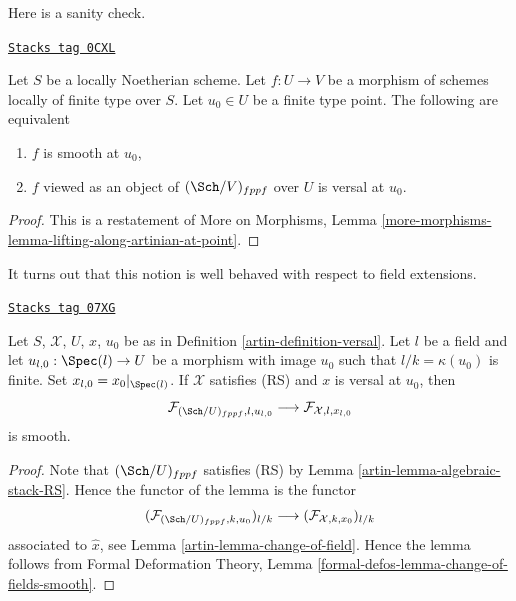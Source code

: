Here is a sanity check.

\begin{lemma}
\label{artin-lemma-versal-implies-smooth}
\href{https://stacks.math.columbia.edu/tag/0CXL}{\texttt{Stacks tag 0CXL}}

Let $S$ be a locally Noetherian scheme. Let $f : U \to V$
be a morphism of schemes locally of finite type over $S$.
Let $u_0 \in U$ be a finite type point. The following are equivalent
\begin{enumerate}
\item $f$ is smooth at $u_0$,
\item $f$ viewed as an object of $(\Sch/V)_{fppf}$ over $U$ is
versal at $u_0$.
\end{enumerate}
\end{lemma}

\begin{proof}
This is a restatement of More on Morphisms, Lemma
\ref{more-morphisms-lemma-lifting-along-artinian-at-point}.
\end{proof}

It turns out that this notion is well behaved with respect to field
extensions.

\begin{lemma}
\label{artin-lemma-versal-change-of-field}
\href{https://stacks.math.columbia.edu/tag/07XG}{\texttt{Stacks tag 07XG}}

Let $S$, $\mathcal{X}$, $U$, $x$, $u_0$ be as in
Definition \ref{artin-definition-versal}. Let $l$ be a field and let
$u_{l, 0} : \Spec(l) \to U$ be a morphism with image $u_0$ such that
$l/k = \kappa(u_0)$ is finite. Set $x_{l, 0} = x_0|_{\Spec(l)}$.
If $\mathcal{X}$ satisfies (RS) and $x$ is versal at $u_0$, then
$$
\mathcal{F}_{(\Sch/U)_{fppf}, l, u_{l, 0}}
\longrightarrow
\mathcal{F}_{\mathcal{X}, l, x_{l, 0}}
$$
is smooth.
\end{lemma}

\begin{proof}

Note that $(\Sch/U)_{fppf}$ satisfies (RS) by
Lemma \ref{artin-lemma-algebraic-stack-RS}.
Hence the functor of the lemma is the functor
$$
(\mathcal{F}_{(\Sch/U)_{fppf}, k , u_0})_{l/k}
\longrightarrow
(\mathcal{F}_{\mathcal{X}, k , x_0})_{l/k}
$$
associated to $\hat x$, see Lemma \ref{artin-lemma-change-of-field}.
Hence the lemma follows from
Formal Deformation Theory, Lemma
\ref{formal-defos-lemma-change-of-fields-smooth}.
\end{proof}

